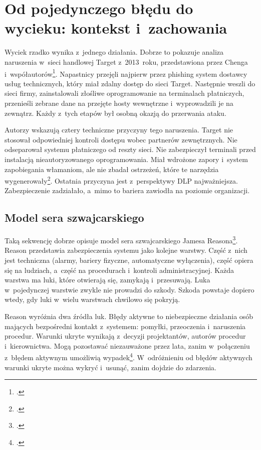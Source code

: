 \documentclass[12pt,a4paper]{article}
\begin{document}
\section{Od pojedynczego błędu do wycieku: kontekst i~zachowania}

Wyciek rzadko wynika z~jednego działania. Dobrze to pokazuje analiza
naruszenia w~sieci handlowej Target z~2013~roku, przedstawiona przez Chenga
i~współautorów\footcite{cheng2017enterprise}. Napastnicy przejęli najpierw
przez phishing system dostawcy usług technicznych, który miał zdalny dostęp
do sieci Target. Następnie weszli do sieci firmy, zainstalowali złośliwe
oprogramowanie na terminalach płatniczych, przenieśli zebrane dane na
przejęte hosty wewnętrzne i~wyprowadzili je na zewnątrz. Każdy z~tych etapów
był osobną okazją do przerwania ataku.

Autorzy wskazują cztery techniczne przyczyny tego naruszenia. Target nie
stosował odpowiedniej kontroli dostępu wobec partnerów zewnętrznych. Nie
odseparował systemu płatniczego od reszty sieci. Nie zabezpieczył terminali
przed instalacją nieautoryzowanego oprogramowania. Miał wdrożone zapory
i~system zapobiegania włamaniom, ale nie zbadał ostrzeżeń, które te narzędzia
wygenerowały\footcite{cheng2017enterprise}. Ostatnia przyczyna jest
z~perspektywy DLP najważniejsza. Zabezpieczenie zadziałało, a~mimo to
bariera zawiodła na poziomie organizacji.

\subsection{Model sera szwajcarskiego}

Taką sekwencję dobrze opisuje model sera szwajcarskiego Jamesa
Reasona\footcite{reason2000human}. Reason przedstawia zabezpieczenia systemu
jako kolejne warstwy. Część z~nich jest techniczna (alarmy, bariery fizyczne,
automatyczne wyłączenia), część opiera się na ludziach, a~część na
procedurach i~kontroli administracyjnej. Każda warstwa ma luki, które
otwierają się, zamykają i~przesuwają. Luka w~pojedynczej warstwie zwykle nie
prowadzi do szkody. Szkoda powstaje dopiero wtedy, gdy luki w~wielu
warstwach chwilowo się pokryją.

Reason wyróżnia dwa źródła luk. Błędy aktywne to niebezpieczne działania
osób mających bezpośredni kontakt z~systemem: pomyłki, przeoczenia
i~naruszenia procedur. Warunki ukryte wynikają z~decyzji projektantów,
autorów procedur i~kierownictwa. Mogą pozostawać niezauważone przez lata,
zanim w~połączeniu z~błędem aktywnym umożliwią
wypadek\footcite{reason2000human}. W~odróżnieniu od błędów aktywnych warunki
ukryte można wykryć i~usunąć, zanim dojdzie do zdarzenia.
\end{document}
